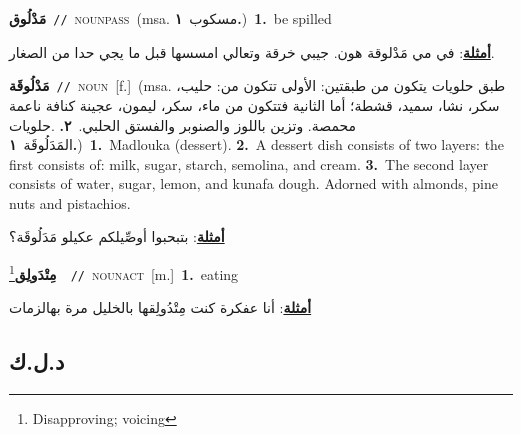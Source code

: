 \documentclass[10pt,a4paper,twoside]{article} %
\begin{document}
\begin{multicols}{2}
{\setlength\topsep{0pt}\textbf{\foreignlanguage{arabic}{مَدْلُوق}}\ {\color{gray}\texttt{//}\color{black}}\ \textsc{noun\textunderscore pass}\ \color{gray}(msa. \foreignlanguage{arabic}{مسكوب}~\foreignlanguage{arabic}{\textbf{١.}})\color{black}\ \textbf{1.}~be spilled\  \begin{flushright}\color{gray}\foreignlanguage{arabic}{\textbf{\underline{\foreignlanguage{arabic}{أمثلة}}}: في مي مَدْلوقة هون. جيبي خرقة وتعالي امسسها قبل ما يجي حدا من الصغار.}\end{flushright}\color{black}} \vspace{2mm}

{\setlength\topsep{0pt}\textbf{\foreignlanguage{arabic}{مَدْلُوقَة}}\ {\color{gray}\texttt{//}\color{black}}\ \textsc{noun}\ [f.]\ \color{gray}(msa. \foreignlanguage{arabic}{طبق حلويات يتكون من طبقتين: الأولى تتكون من: حليب، سكر، نشا، سميد، قشطة؛ أما الثانية فتتكون من ماء، سكر، ليمون، عجينة كنافة ناعمة محمصة. وتزين باللوز والصنوبر والفستق الحلبي.}~\foreignlanguage{arabic}{\textbf{٢.}}  .\foreignlanguage{arabic}{حلويات المَدَلُوقَة}~\foreignlanguage{arabic}{\textbf{١.}})\color{black}\ \textbf{1.}~Madlouka (dessert).  \textbf{2.}~A dessert dish consists of two layers: the first consists of: milk, sugar, starch, semolina, and cream.  \textbf{3.}~The second layer consists of water, sugar, lemon, and kunafa dough. Adorned with almonds, pine nuts and pistachios.\  \begin{flushright}\color{gray}\foreignlanguage{arabic}{\textbf{\underline{\foreignlanguage{arabic}{أمثلة}}}: بتبحبوا أوصِّيلكم عكيلو مَدَلُوقَة؟}\end{flushright}\color{black}} \vspace{2mm}

{\setlength\topsep{0pt}\textbf{\foreignlanguage{arabic}{مِتْدَولِق}}\footnote{Disapproving; voicing}\ \ {\color{gray}\texttt{//}\color{black}}\ \textsc{noun\textunderscore act}\ [m.]\ \textbf{1.}~eating\  \begin{flushright}\color{gray}\foreignlanguage{arabic}{\textbf{\underline{\foreignlanguage{arabic}{أمثلة}}}: أنا عفكرة كنت مِتْدُولِقها بالخليل مرة بهالزمات}\end{flushright}\color{black}} \vspace{2mm}

\vspace{-3mm}
\subsection*{\color{blue}\foreignlanguage{arabic}{د.ل.ك}\color{blue}{}} 


\end{multicols}
\end{document}
